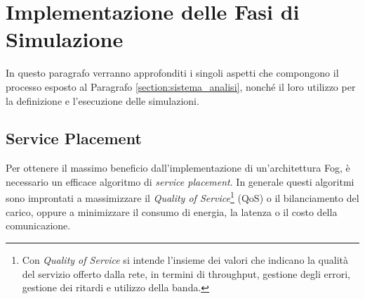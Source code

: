 \section{Implementazione delle Fasi di Simulazione}

In questo paragrafo verranno approfonditi i singoli aspetti che compongono il processo esposto al Paragrafo \ref{section:sistema_analisi}, nonché il loro utilizzo per la definizione e l'esecuzione delle simulazioni.

\subsection{Service Placement}

Per ottenere il massimo beneficio dall'implementazione di un'architettura Fog, è necessario un efficace algoritmo di \textit{service placement}. In generale questi algoritmi sono improntati a massimizzare il \textit{Quality of Service}\footnote{Con \textit{Quality of Service} si intende l'insieme dei valori che indicano la qualità del servizio offerto dalla rete, in termini di throughput, gestione degli errori, gestione dei ritardi e utilizzo della banda.} (QoS) o il bilanciamento del carico, oppure a minimizzare il consumo di energia, la latenza o il costo della comunicazione.